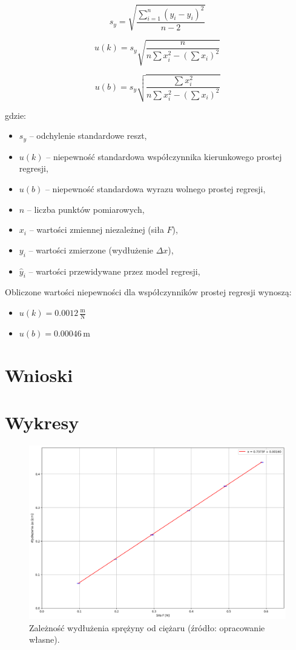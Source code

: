 \documentclass[a4paper,12pt]{article}
\begin{document}
\[
    s_y = \sqrt{\frac{\sum_{i=1}^{n} (y_i - \hat{y}_i)^2}{n-2}}
\]

\[
    u(k) = s_y \sqrt{\frac{n}{n \sum x_i^2 - \left( \sum x_i \right)^2}}
\]

\[
    u(b) = s_y \sqrt{\frac{\sum x_i^2}{n \sum x_i^2 - \left( \sum x_i \right)^2}}
\]

gdzie:

\begin{itemize}
    \setlength{\itemsep}{0em}
    \item $s_y$ -- odchylenie standardowe reszt,
    \item $u(k)$ -- niepewność standardowa współczynnika kierunkowego prostej regresji,
    \item $u(b)$ -- niepewność standardowa wyrazu wolnego prostej regresji,
    \item $n$ -- liczba punktów pomiarowych,
    \item $x_i$ -- wartości zmiennej niezależnej (siła $F$),
    \item $y_i$ -- wartości zmierzone (wydłużenie $\Delta x$),
    \item $\hat{y}_i$ -- wartości przewidywane przez model regresji,
\end{itemize}

Obliczone wartości niepewności dla współczynników prostej regresji wynoszą:

\begin{itemize}
    \setlength{\itemsep}{0em}
    \item $u(k) = 0.0012\,\frac{\text{m}}{\text{N}}$
    \item $u(b) = 0.00046\,\text{m}$
\end{itemize}


\section{Wnioski}

\section{Wykresy}

\begin{figure}[H]
    \centering
    \includegraphics[width=1.2\linewidth,angle=90]{2-x(F).png}
    \caption{Zależność wydłużenia sprężyny od ciężaru (źródło: opracowanie własne).}
    \label{fig:zaleznosci}
\end{figure}




\end{document}
